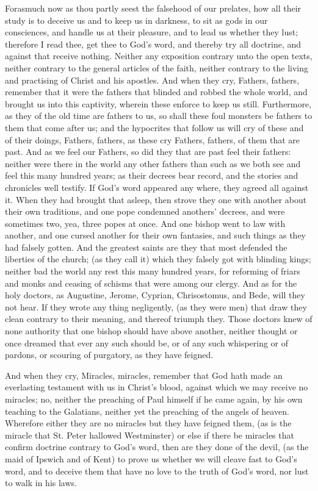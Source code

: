 Forasmuch now as thou partly seest the falsehood of 
our prelates, how all their study is to deceive us and to 
keep us in darkness, to sit as gods in our consciences, and 
handle us at their pleasure, and to lead us whether they 
lust; therefore I read thee, get thee to God's word, and 
thereby try all doctrine, and against that receive nothing. 
Neither any exposition contrary unto the open texts, neither 
contrary to the general articles of the faith, neither contrary
to the living and practising of Christ and his apostles. 
And when they cry, Fathers, fathers, remember that it were
the fathers that blinded and robbed the whole world, and 
brought us into this captivity, wherein these enforce to 
keep us still. Furthermore, as they of the old time are 
fathers to us, so shall these foul monsters be fathers to 
them that come after us; and the hypocrites that follow us 
will cry of these and of their doings, Fathers, fathers, as 
these cry Fathers, fathers, of them that are past. And as we 
feel our Fathers, so did they that are past feel their fathers: 
neither were there in the world any other fathers than such 
as we both see and feel this many hundred years; as their 
decrees bear record, and the stories and chronicles well testify.
If God's word appeared any where, they agreed all 
against it. When they had brought that asleep, then 
strove they one with another about their own traditions, 
and one pope condemned anothers' decrees, and were 
sometimes two, yea, three popes at once. And one bishop 
went to law with another, and one cursed another for their 
own fantasies, and such things as they had falsely gotten. 
And the greatest saints are they that most defended the liberties
of the church; (as they call it) which they falsely got 
with blinding kings; neither bad the world any rest this 
many hundred years, for reforming of friars and monks 
and ceasing of schisms that were among our clergy. And 
as for the holy doctors, as Augustine, Jerome, Cyprian, 
Chrisostomus, and Bede, will they not hear. If they 
wrote any thing negligently, (as they were men) that draw 
they clean contrary to their meaning, and thereof triumph 
they. Those doctors knew of none authority that one 
bishop should have above another, neither thought or once 
dreamed that ever any such should be, or of any such 
whispering or of pardons, or scouring of purgatory, as 
they have feigned. 

And when they cry, Miracles, miracles, remember that 
God hath made an everlasting testament with us in Christ's 
blood, against which we may receive no miracles; no, neither 
the preaching of Paul himself if he came again, by his 
own teaching to the Galatians, neither yet the preaching of 
the angels of heaven. Wherefore either they are no miracles
but they have feigned them, (as is the miracle that 
St. Peter hallowed Westminster) or else if there be miracles 
that confirm doctrine contrary to God's word, then are they 
done of the devil, (as the maid of Ipswich and of Kent) to 
prove us whether we will cleave fast to God's word, and 
to deceive them that have no love to the truth of God's 
word, nor lust to walk in his laws. 

